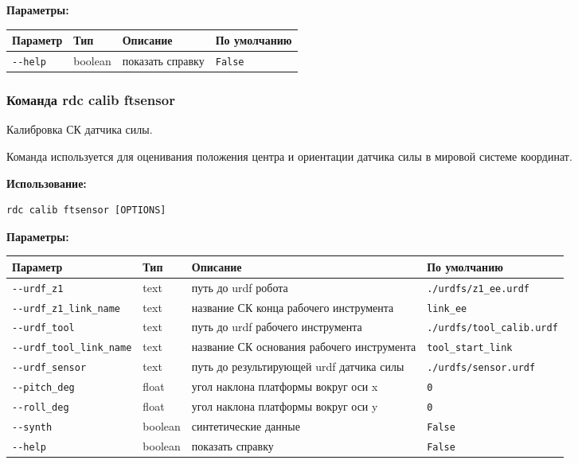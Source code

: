 \textbf{Параметры:}
\begin{center}
\fontsize{10pt}{10pt}\selectfont
\begin{longtable}[]{p{5cm}|p{2cm}|p{3.5cm}|p{5cm}}
    \hline
\toprule()
Параметр & Тип & Описание & По умолчанию \\
\hline
\midrule()
\endhead
\texttt{-\/-help} & boolean & показать справку &
\texttt{False} \\
\bottomrule()
\hline
\end{longtable}
\end{center}

\hypertarget{rdc-calib-ftsensor}{%
\subsubsection{ Команда rdc calib ftsensor}\label{rdc-calib-ftsensor}}

Калибровка СК датчика силы.

Команда используется для оценивания положения центра и ориентации датчика силы в мировой системе координат.

\textbf{Использование:}
\begin{lstlisting}[language=python, numbers=none, frame=single]
rdc calib ftsensor [OPTIONS]
\end{lstlisting}

\textbf{Параметры:}
\begin{center}
\fontsize{10pt}{10pt}\selectfont
\begin{longtable}[]{p{5.2cm}|p{2cm}|p{3.5cm}|p{5cm}}
    \hline
\toprule()
Параметр & Тип & Описание & По умолчанию \\
\hline
\midrule()
\endhead
\texttt{-\/-urdf\_z1} & text & путь до urdf робота &
\texttt{./urdfs/z1\_ee.urdf} \\
\hline
\texttt{-\/-urdf\_z1\_link\_name} & text & название СК конца рабочего инструмента &
\texttt{link\_ee} \\
\hline
\texttt{-\/-urdf\_tool} & text & путь до urdf рабочего инструмента &
\texttt{./urdfs/tool\_calib.urdf} \\
\hline
\texttt{-\/-urdf\_tool\_link\_name} & text & название СК основания рабочего инструмента & \texttt{tool\_start\_link} \\
\hline
\texttt{-\/-urdf\_sensor} & text & путь до результирующей urdf датчика силы &
\texttt{./urdfs/sensor.urdf} \\
\hline
\texttt{-\/-pitch\_deg} & float & угол наклона платформы вокруг оси x &
\texttt{0} \\
\hline
\texttt{-\/-roll\_deg} & float & угол наклона платформы вокруг оси y &
\texttt{0} \\
\hline
\texttt{-\/-synth} & boolean & синтетические данные & \texttt{False} \\
\hline
\texttt{-\/-help} & boolean & показать справку &
\texttt{False} \\
\hline
\bottomrule()
\hline
\end{longtable}
\end{center}

